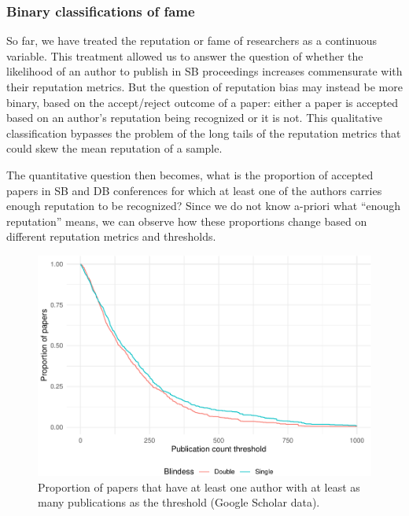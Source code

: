 \documentclass[12pt]{article}
\begin{document}
\hypertarget{binary-classifications-of-fame}{%
\subsubsection{Binary classifications of fame}\label{binary-classifications-of-fame}}

So far, we have treated the reputation or fame of researchers as a continuous variable.
This treatment allowed us to answer the question of whether the likelihood of an author to publish in SB proceedings increases commensurate with their reputation metrics.
But the question of reputation bias may instead be more binary, based on the accept/reject outcome of a paper: either a paper is accepted based on an author's reputation being recognized or it is not.
This qualitative classification bypasses the problem of the long tails of the reputation metrics that could skew the mean reputation of a sample.

The quantitative question then becomes, what is the proportion of accepted papers in SB and DB conferences for which at least one of the authors carries enough reputation to be recognized?
Since we do not know a-priori what ``enough reputation'' means, we can observe how these proportions change based on different reputation metrics and thresholds.

\begin{figure}
\centering
\includegraphics{prestige_files/figure-latex/rep-threshold-npubs-1.pdf}
\caption{\label{fig:rep-threshold-npubs}Proportion of papers that have at least one author with at least as many publications as the threshold (Google Scholar data).}
\end{figure}
\end{document}
